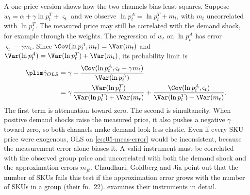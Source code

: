 A one-price version shows how the two channels bias least squares. Suppose $w_t = \alpha + \gamma\ln
p_t^T + \varsigma_t$ and we observe $\ln p_t^A = \ln p_t^T + m_t$, with $m_t$ uncorrelated with $\ln
p_t^T$. The measured price may still be correlated with the demand shock, for example through the
weights. The regression of $w_t$ on $\ln p_t^A$ has error $\varsigma_t - \gamma m_t$. Since
$\Cov(\ln p_t^A, m_t) = \Var(m_t)$ and $\Var(\ln p_t^A) = \Var(\ln p_t^T) + \Var(m_t)$, its probability
limit is
\begin{equation}\label{eq:05-meas-bias}
\begin{split}
  \plim\hat\gamma_{OLS}
  &= \gamma + \frac{\Cov(\ln p_t^A, \varsigma_t - \gamma m_t)}{\Var(\ln p_t^A)} \\
  &= \gamma\,\frac{\Var(\ln p_t^T)}{\Var(\ln p_t^T) + \Var(m_t)}
   + \frac{\Cov(\ln p_t^A, \varsigma_t)}{\Var(\ln p_t^T) + \Var(m_t)} .
\end{split}
\end{equation}
The first term is attenuation toward zero. The second is simultaneity. When positive demand shocks raise
the measured price, it also pushes a negative $\gamma$ toward zero, so both channels make demand look
less elastic. Even if every SKU price were exogenous, OLS on \eqref{eq:05-meas-error} would be
inconsistent, because the measurement error alone biases it. A valid instrument must be correlated with
the observed group price and uncorrelated with both the demand shock and the approximation errors
$m_{jt}$. Chaudhuri, Goldberg and Jia point out that the number of SKUs fails this test if the
approximation error grows with the number of SKUs in a group (their fn.~22).
 examines their instruments in detail.
